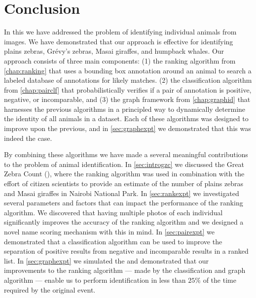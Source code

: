 \begin{comment}
    ./texfix.py --fpaths chapter6-conclusion.tex --outline --asmarkdown --numlines=99 -w
    fixtex --fpaths chapter6-conclusion.tex --outline --asmarkdown --numlines=999 --shortcite
\end{comment}

\chapter{Conclusion}\label{chap:conclusion} 

    In this \thesis{} we have addressed the problem of identifying individual animals from images.
    We have demonstrated that our approach is effective for identifying plains zebras, Grévy's zebras, Masai
      giraffes, and humpback whales.
    Our approach consists of three main components:
    (1) the ranking algorithm from \cref{chap:ranking} that uses a bounding box annotation around an animal to
      search a labeled database of annotations for likely matches.
    (2) the classification algorithm from \cref{chap:pairclf} that probabilistically verifies if a pair of
      annotation is positive, negative, or incomparable, and
    (3) the graph framework from \cref{chap:graphid} that harnesses the previous algorithms in a principled way
      to dynamically determine the identity of all animals in a dataset.
    Each of these algorithms was designed to improve upon the previous, and in \cref{sec:graphexpt} we
      demonstrated that this was indeed the case.

    By combining these algorithms we have made a several meaningful contributions to the problem of animal
      identification.
    In \cref{sec:introgzc} we discussed the Great Zebra Count (\GZC{}), where the ranking algorithm was used in
      combination with the effort of citizen scientists to provide an estimate of the number of plains zebras and
      Masai giraffes in Nairobi National Park.
    In \cref{sec:rankexpt} we investigated several parameters and factors that can impact the performance of the
      ranking algorithm.
    We discovered that having multiple photos of each individual significantly improves the accuracy of the
      ranking algorithm and we designed a novel name scoring mechanism with this in mind.
    In \cref{sec:pairexpt} we demonstrated that a classification algorithm can be used to improve the separation
      of positive results from negative and incomparable results in a ranked list.
    In \cref{sec:graphexpt} we simulated the \GZC{} and demonstrated that our improvements to the ranking
      algorithm --- made by the classification and graph algorithm --- enable us to perform identification in less
      than $25\percent$ of the time required by the original event.

